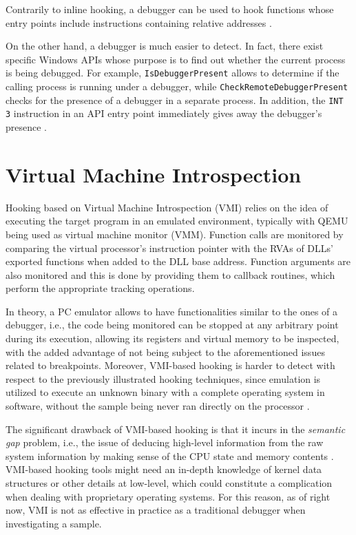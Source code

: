 Contrarily to inline hooking, a debugger can be used to hook functions whose entry points include instructions containing relative addresses \cite{Berdajs:2010:EAU:1815744.1815746}.

On the other hand, a debugger is much easier to detect. In fact, there exist specific Windows APIs whose purpose is to find out whether the current process is being debugged. For example, \texttt{IsDebuggerPresent} allows to determine if the calling process is running under a debugger, while \texttt{CheckRemoteDebuggerPresent} checks for the presence of a debugger in a separate process. 
In addition, the \texttt{INT 3} instruction in an API entry point immediately gives away the debugger's presence \cite{HookingDetection}.



\section{Virtual Machine Introspection}

Hooking based on Virtual Machine Introspection (VMI) relies on the idea of executing the target program in an emulated environment, typically with QEMU being used as virtual machine monitor (VMM). Function calls are monitored by comparing the virtual processor's instruction pointer with the RVAs of DLLs' exported functions when added to the DLL base address. Function arguments are also monitored and this is done by providing them to callback routines, which perform the appropriate tracking operations.

In theory, a PC emulator allows to have functionalities similar to the ones of a debugger, i.e., the code being monitored can be stopped at any arbitrary point during its execution, allowing its registers and virtual memory to be inspected, with the added advantage of not being subject to the aforementioned issues related to breakpoints.
Moreover, VMI-based hooking is harder to detect with respect to the previously illustrated hooking techniques, since emulation is utilized to execute an unknown binary with a complete operating system in software, without the sample being never ran directly on the processor \cite{Bayer2005TTAnalyzeA}.

The significant drawback of VMI-based hooking is that it incurs in the \textit{semantic gap} problem, i.e., the issue of deducing high-level information from the raw system information by making sense of the CPU state and memory contents \cite{Egele:2008:SAD:2089125.2089126}. VMI-based hooking tools
might need an in-depth knowledge of kernel data structures or other details at low-level, which could constitute a complication when dealing with proprietary operating systems. For this reason, as of right now, VMI is not as effective in practice as a traditional debugger when investigating a sample.



